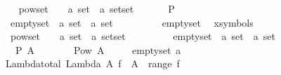 \begin{isabellebody}
\ \isanewline
\ \ {\isachardoublequoteopen}{\isacharat}powset{\isachardoublequoteclose}\ \ \ {\isacharcolon}{\isacharcolon}\ {\isachardoublequoteopen}{\isacharparenleft}{\isacharprime}a\ set{\isacharparenright}\ {\isacharequal}{\isachargreater}\ {\isacharparenleft}{\isacharprime}a\ set{\isacharparenright}set{\isachardoublequoteclose}\ \ \ \ \ \ \ {\isacharparenleft}{\isachardoublequoteopen}{\isacharpercent}P{\isachardoublequoteclose}{\isacharparenright}\isanewline
\ \ {\isachardoublequoteopen}{\isacharat}emptyset{\isachardoublequoteclose}\ {\isacharcolon}{\isacharcolon}\ {\isachardoublequoteopen}{\isacharparenleft}{\isacharprime}a\ set{\isacharparenright}\ {\isacharequal}{\isachargreater}\ {\isacharparenleft}{\isacharprime}a\ set{\isacharparenright}{\isachardoublequoteclose}\ \ \ \ \ \ \ \ \ \ {\isacharparenleft}{\isachardoublequoteopen}emptyset{\isacharunderscore}{\isachardoublequoteclose}\ {}{}{\isacharparenright}\isanewline
\isanewline
{}\isamarkupfalse%
\ {\isacharparenleft}xsymbols{\isacharparenright}\isanewline
\ \ {\isachardoublequoteopen}{\isacharat}powset{\isachardoublequoteclose}\ \ \ {\isacharcolon}{\isacharcolon}\ {\isachardoublequoteopen}{\isacharparenleft}{\isacharprime}a\ set{\isacharparenright}\ {\isacharequal}{\isachargreater}\ {\isacharparenleft}{\isacharprime}a\ set{\isacharparenright}set{\isachardoublequoteclose}\ \ \ \ \ \ \ {\isacharparenleft}{\isachardoublequoteopen}{\isasympower}{\isachardoublequoteclose}{\isacharparenright}\isanewline
\ \ {\isachardoublequoteopen}{\isacharat}emptyset{\isachardoublequoteclose}\ {\isacharcolon}{\isacharcolon}\ {\isachardoublequoteopen}{\isacharparenleft}{\isacharprime}a\ set{\isacharparenright}\ {\isacharequal}{\isachargreater}\ {\isacharparenleft}{\isacharprime}a\ set{\isacharparenright}{\isachardoublequoteclose}\ \ \ \ \ \ \ \ \ \ {\isacharparenleft}{\isachardoublequoteopen}{\isasymemptyset}{\isacharunderscore}{\isachardoublequoteclose}\ {}{}{\isacharparenright}\isanewline
\isanewline
{}\isamarkupfalse%
\ \isanewline
\ \ \ {\isachardoublequoteopen}{\isacharpercent}P\ A{\isachardoublequoteclose}\ \ \ \ \ \ \ {\isacharequal}{\isacharequal}\ {\isachardoublequoteopen}Pow\ A{\isachardoublequoteclose}\ \ \isanewline
\ \ \ {\isachardoublequoteopen}emptyset\ a{\isachardoublequoteclose}\ {\isacharequal}{\isachargreater}\ {\isachardoublequoteopen}{\isacharbraceleft}{\isacharbraceright}{\isachardoublequoteclose}%
\isamarkuptrue%
\isamarkupfalse%
\ Lambda{\isacharunderscore}total{\isacharcolon}\ {\isachardoublequoteopen}Lambda\ A\ f\ {\isacharcolon}\ {\isacharparenleft}A\ {\isacharminus}{\isacharminus}{\isacharminus}{\isachargreater}\ {\isacharparenleft}range\ f{\isacharparenright}{\isacharparenright}{\isachardoublequoteclose}\isanewline

\end{isabellebody}
